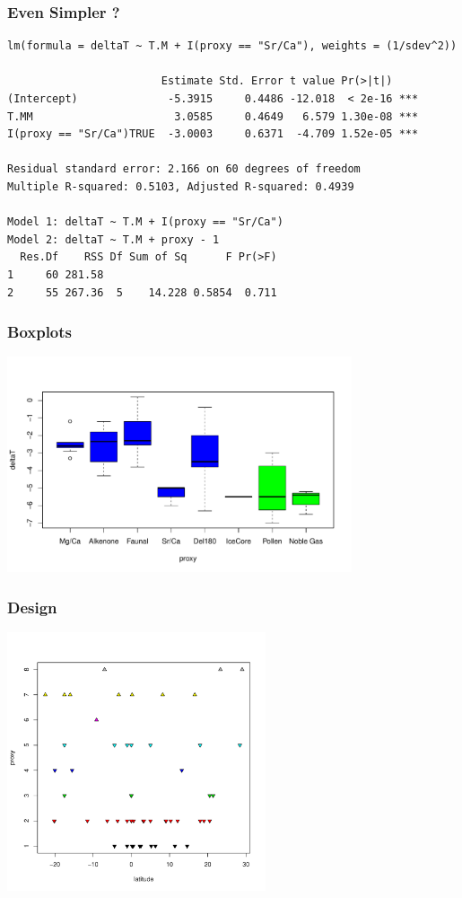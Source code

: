 \documentclass[handout]{beamer}
\begin{document}
\begin{frame}[fragile]
  \frametitle{Even Simpler ?}
  \begin{small}
\begin{verbatim}
lm(formula = deltaT ~ T.M + I(proxy == "Sr/Ca"), weights = (1/sdev^2))

                        Estimate Std. Error t value Pr(>|t|)    
(Intercept)              -5.3915     0.4486 -12.018  < 2e-16 ***
T.MM                      3.0585     0.4649   6.579 1.30e-08 ***
I(proxy == "Sr/Ca")TRUE  -3.0003     0.6371  -4.709 1.52e-05 ***

Residual standard error: 2.166 on 60 degrees of freedom
Multiple R-squared: 0.5103,	Adjusted R-squared: 0.4939 

Model 1: deltaT ~ T.M + I(proxy == "Sr/Ca") 
Model 2: deltaT ~ T.M + proxy - 1
  Res.Df    RSS Df Sum of Sq      F Pr(>F)
1     60 281.58                           
2     55 267.36  5    14.228 0.5854  0.711
\end{verbatim}
\end{small}
\end{frame}
\begin{frame}
  \frametitle{Boxplots}
\centerline{ \includegraphics[height=2.5in]{box}}
\end{frame}
\begin{frame}
  \frametitle{Design}
  \centerline{\includegraphics[height=3in]{lat-proxy}}
\end{frame}
\end{document}

